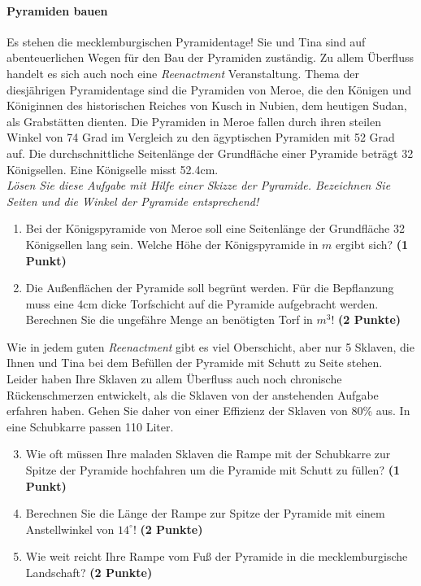 \documentclass[a4paper, 9pt]{scrartcl}\usepackage[]{graphicx}\usepackage[]{xcolor}
\begin{document}
\paragraph{Pyramiden bauen}



Es stehen die mecklemburgischen Pyramidentage! Sie und Tina sind auf abenteuerlichen Wegen für den Bau der Pyramiden zuständig. Zu allem Überfluss handelt es sich auch noch eine \textit{Reenactment} Veranstaltung. Thema der diesjährigen Pyramidentage sind die Pyramiden von Meroe, die den Königen und Königinnen des historischen Reiches von Kusch in Nubien, dem heutigen Sudan, als Grabstätten dienten. Die Pyramiden in Meroe fallen durch ihren steilen Winkel von 74 Grad im Vergleich zu den ägyptischen Pyramiden mit 52 Grad auf. Die durchschnittliche Seitenlänge der Grundfläche einer Pyramide beträgt 32 Königsellen. Eine Königselle misst 52.4cm.\\

\textit{Lösen Sie diese Aufgabe mit Hilfe einer Skizze der Pyramide. Bezeichnen Sie Seiten und die Winkel der Pyramide entsprechend!}

\begin{enumerate}
\item Bei der Königspyramide von Meroe soll eine Seitenlänge der Grundfläche 32 Königsellen lang sein. Welche Höhe der Königspyramide in $m$ ergibt sich? \textbf{(1 Punkt)}
\item Die Außenflächen der Pyramide soll begrünt werden. Für die Bepflanzung muss eine 4cm dicke Torfschicht auf die Pyramide aufgebracht werden. Berechnen Sie die ungefähre Menge an benötigten Torf in $m^3$! \textbf{(2 Punkte)}
\end{enumerate}

Wie in jedem guten \textit{Reenactment} gibt es viel Oberschicht, aber nur 5 Sklaven, die Ihnen und Tina bei dem Befüllen der Pyramide mit Schutt zu Seite stehen. Leider haben Ihre Sklaven zu allem Überfluss auch noch chronische Rückenschmerzen entwickelt, als die Sklaven von der anstehenden Aufgabe erfahren haben. Gehen Sie daher von einer Effizienz der Sklaven von 80\% aus. In eine Schubkarre passen 110 Liter.

\begin{enumerate}
  \setcounter{enumi}{2}
\item Wie oft müssen Ihre maladen Sklaven die Rampe mit der Schubkarre zur Spitze der Pyramide hochfahren um die Pyramide mit Schutt zu füllen? \textbf{(1 Punkt)}
\item Berechnen Sie die Länge der Rampe zur Spitze der Pyramide mit einem Anstellwinkel von $14^\circ$! \textbf{(2 Punkte)}
\item Wie weit reicht Ihre Rampe vom Fuß der Pyramide in die mecklemburgische Landschaft?  \textbf{(2 Punkte)}
\end{enumerate}
\end{document}
